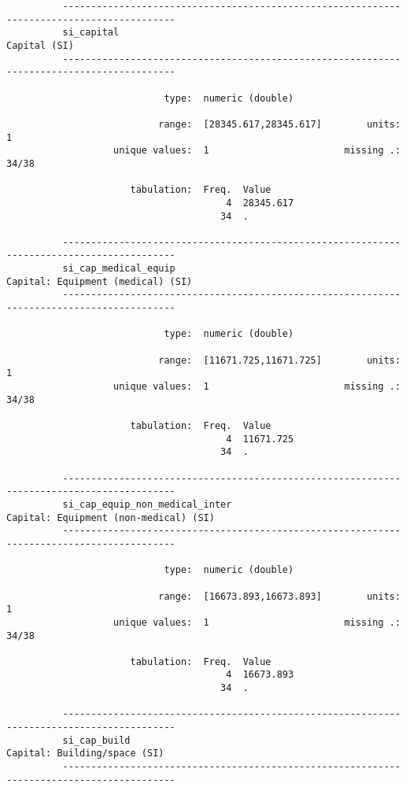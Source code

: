 \documentclass{article}
\begin{document}
\begin{verbatim}
          ------------------------------------------------------------------------------------------
          si_capital                                                                    Capital (SI)
          ------------------------------------------------------------------------------------------
          
                            type:  numeric (double)
          
                           range:  [28345.617,28345.617]        units:  1
                   unique values:  1                        missing .:  34/38
          
                      tabulation:  Freq.  Value
                                       4  28345.617
                                      34  .
          
          ------------------------------------------------------------------------------------------
          si_cap_medical_equip                                     Capital: Equipment (medical) (SI)
          ------------------------------------------------------------------------------------------
          
                            type:  numeric (double)
          
                           range:  [11671.725,11671.725]        units:  1
                   unique values:  1                        missing .:  34/38
          
                      tabulation:  Freq.  Value
                                       4  11671.725
                                      34  .
          
          ------------------------------------------------------------------------------------------
          si_cap_equip_non_medical_inter                       Capital: Equipment (non-medical) (SI)
          ------------------------------------------------------------------------------------------
          
                            type:  numeric (double)
          
                           range:  [16673.893,16673.893]        units:  1
                   unique values:  1                        missing .:  34/38
          
                      tabulation:  Freq.  Value
                                       4  16673.893
                                      34  .
          
          ------------------------------------------------------------------------------------------
          si_cap_build                                                  Capital: Building/space (SI)
          ------------------------------------------------------------------------------------------
          

\end{verbatim}
\end{document}

